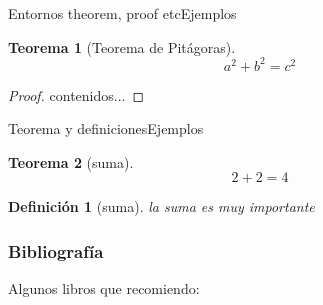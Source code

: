 \documentclass[dvipsnames, 11pt]{beamer}
\newtheorem{teo}{Teorema}
\newtheorem{defi}{Definición}
\begin{document}
\begin{frame}{Entornos theorem, proof etc}{Ejemplos}
	
	\begin{teo}[Teorema de Pitágoras]
		\begin{equation*}
			a^2 + b^2 = c^2	
		\end{equation*}
	\end{teo}
	
	\begin{proof}
		contenidos...
	\end{proof}
	
\end{frame}



\begin{frame}{Teorema y definiciones}{Ejemplos}
	
	\begin{teo}[suma]
		$$2+2=4$$
	\end{teo}
	
	\begin{defi}[suma]
		la suma es muy importante
	\end{defi}
	
\end{frame}



\begin{frame}[allowframebreaks]
	\frametitle{Bibliografía}

	Algunos libros que recomiendo: \cite{Alfonso2010, Beatriz2011}

	
	
	
\end{frame}
\end{document}
